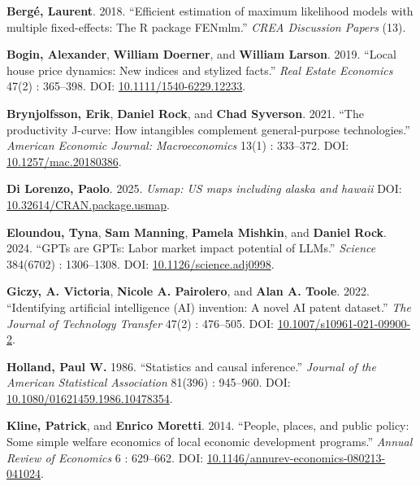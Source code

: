 \documentclass[
]{article}
\newlength{\cslhangindent}
\newenvironment{CSLReferences}[2] %
 {\begin{list}{}{%
  \setlength{\itemindent}{0pt}
  \setlength{\leftmargin}{0pt}
  \setlength{\parsep}{0pt}
  \ifodd #1
   \setlength{\leftmargin}{\cslhangindent}
   \setlength{\itemindent}{-1\cslhangindent}
  \fi
  \setlength{\itemsep}{#2\baselineskip}}}
 {\end{list}}
\begin{document}
\begin{CSLReferences}{1}{0}
\textbf{Bergé, Laurent}. 2018. {``Efficient estimation of maximum
likelihood models with multiple fixed-effects: The {R} package
{FENmlm}.''} \emph{CREA Discussion Papers} (13).

\textbf{Bogin, Alexander}, \textbf{William Doerner}, and \textbf{William
Larson}. 2019. {``Local house price dynamics: New indices and stylized
facts.''} \emph{Real Estate Economics} 47(2) : 365--398. DOI:
\href{https://doi.org/10.1111/1540-6229.12233}{10.1111/1540-6229.12233}.

\textbf{Brynjolfsson, Erik}, \textbf{Daniel Rock}, and \textbf{Chad
Syverson}. 2021. {``The productivity {J}-curve: How intangibles
complement general-purpose technologies.''} \emph{American Economic
Journal: Macroeconomics} 13(1) : 333--372. DOI:
\href{https://doi.org/10.1257/mac.20180386}{10.1257/mac.20180386}.

\textbf{Di Lorenzo, Paolo}. 2025. \emph{Usmap: US maps including alaska
and hawaii} DOI:
\href{https://doi.org/10.32614/CRAN.package.usmap}{10.32614/CRAN.package.usmap}.

\textbf{Eloundou, Tyna}, \textbf{Sam Manning}, \textbf{Pamela Mishkin},
and \textbf{Daniel Rock}. 2024. {``{GPTs} are {GPTs}: Labor market
impact potential of {LLMs}.''} \emph{Science} 384(6702) : 1306--1308.
DOI:
\href{https://doi.org/10.1126/science.adj0998}{10.1126/science.adj0998}.

\textbf{Giczy, A. Victoria}, \textbf{Nicole A. Pairolero}, and
\textbf{Alan A. Toole}. 2022. {``Identifying artificial intelligence
({AI}) invention: A novel {AI} patent dataset.''} \emph{The Journal of
Technology Transfer} 47(2) : 476--505. DOI:
\href{https://doi.org/10.1007/s10961-021-09900-2}{10.1007/s10961-021-09900-2}.

\textbf{Holland, Paul W.} 1986. {``Statistics and causal inference.''}
\emph{Journal of the American Statistical Association} 81(396) :
945--960. DOI:
\href{https://doi.org/10.1080/01621459.1986.10478354}{10.1080/01621459.1986.10478354}.

\textbf{Kline, Patrick}, and \textbf{Enrico Moretti}. 2014. {``People,
places, and public policy: Some simple welfare economics of local
economic development programs.''} \emph{Annual Review of Economics} 6 :
629--662. DOI:
\href{https://doi.org/10.1146/annurev-economics-080213-041024}{10.1146/annurev-economics-080213-041024}.


\end{CSLReferences}
\end{document}

